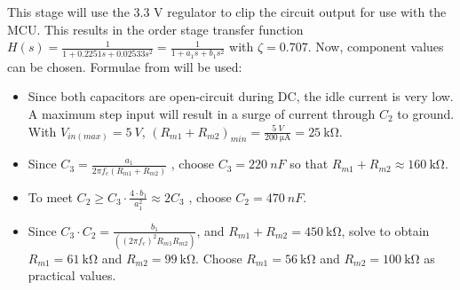 This stage will use the 3.3 V regulator to clip the circuit output for use with the MCU.
This results in the  order stage transfer function $H(s) = \frac{1}{1 + 0.2251 s + 0.02533 s^2} = \frac{1}{1 + a_1 s + b_1 s^2}$ with $\zeta = 0.707$. Now, component values can be chosen.
Formulae from \cite{filterDesign} will be used:

\begin{itemize}
  \item Since both capacitors are open-circuit during DC, the idle current is very low. A maximum step input will result in a surge of current through $C_2$ to ground.
        With $V_{in(max)} = \SI{5}{V}$, $(R_{m1} + R_{m2})_{min} = \frac{\SI{5}{V}}{\SI{200}{\micro\ampere}} = \SI{25}{\kilo\ohm}$.
  \item Since $C_3 = \frac{a_1}{2 \pi f_c (R_{m1} + R_{m2})}$ \cite{filterDesign}, choose $C_3 = \SI{220}{nF}$ so that $R_{m1} + R_{m2} \approx \SI{160}{\kilo\ohm}$.
  \item To meet $C_2 \geq C_3 \cdot \frac{4 \cdot b_1}{a_1 ^2} \approx 2 C_3 $ \cite{filterDesign}, choose $C_2 = \SI{470}{nF}$.
  \item Since $C_3 \cdot C_2 = \frac{b_1}{((2 \pi f_c)^2 R_{m1} R_{m2})}$, and $R_{m1} + R_{m2} = \SI{450}{\kilo\ohm}$, solve to obtain $R_{m1} = \SI{61}{\kilo\ohm}$ and $R_{m2} = \SI{99}{\kilo\ohm}$.
        Choose $R_{m1} = \SI{56}{\kilo\ohm}$ and $R_{m2} = \SI{100}{\kilo\ohm}$ as practical values.
\end{itemize}